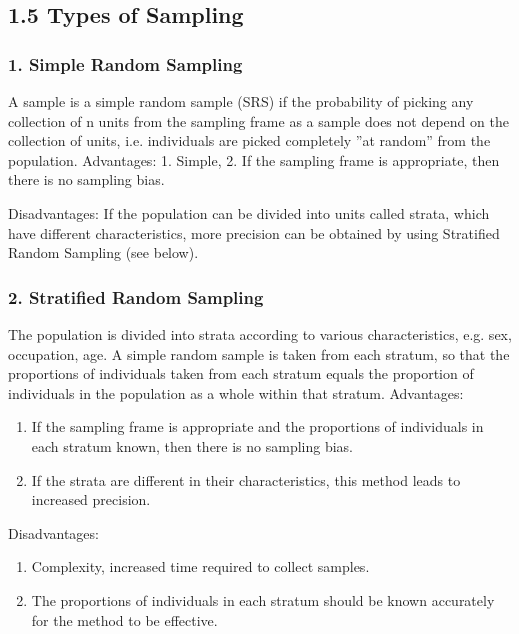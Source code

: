 
\subsection{1.5 Types of Sampling}
\subsubsection{1. Simple Random Sampling}
A sample is a simple random sample (SRS) if the probability of picking any collection of n units from the sampling frame as a
sample does not depend on the collection of units, i.e. individuals
are picked completely ”at random” from the population. Advantages: 1. Simple, 2. If the sampling frame is appropriate,
then there is no sampling bias.

Disadvantages: If the population can be divided into units called strata, which have different characteristics, more precision can be
obtained by using Stratified Random Sampling (see below).

\subsubsection{2. Stratified Random Sampling}
The population is divided into strata according to various
characteristics, e.g. sex, occupation, age. A simple random sample is taken from each stratum, so that the
proportions of individuals taken from each stratum equals the proportion of individuals in the population as a whole within that
stratum.
Advantages:
\begin{enumerate} 
\item If the sampling frame is appropriate and the proportions of individuals in each stratum known, then there is no
sampling bias.
\item If the strata are different in their characteristics, this method
leads to increased precision.
\end{enumerate}

Disadvantages:
\begin{enumerate} 
\item  Complexity, increased time required to collect
samples.
\item The proportions of individuals in each stratum should be known
accurately for the method to be effective.
\end{enumerate}
